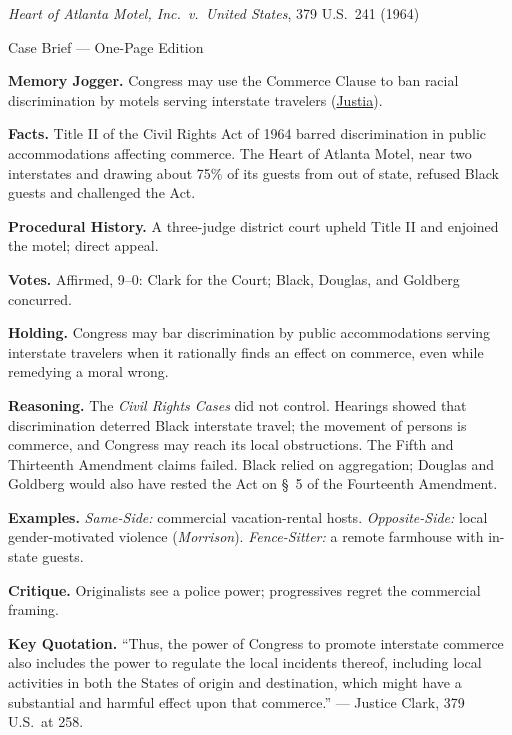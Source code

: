 \documentclass[12pt]{article}
\begin{document}
\begin{center}
{\Large \textit{Heart of Atlanta Motel, Inc.\ v.\ United States}, 379 U.S.\ 241 (1964)\par}
\vspace{0.3em}
{\normalsize Case Brief --- One-Page Edition\par}
\end{center}

\textbf{Memory Jogger.} Congress may use the Commerce Clause to ban racial discrimination by motels serving interstate travelers (\href{https://supreme.justia.com/cases/federal/us/379/241/}{Justia}).

\textbf{Facts.} Title II of the Civil Rights Act of 1964 barred discrimination in public accommodations affecting commerce. The Heart of Atlanta Motel, near two interstates and drawing about 75\% of its guests from out of state, refused Black guests and challenged the Act.

\textbf{Procedural History.} A three-judge district court upheld Title II and enjoined the motel; direct appeal.

\textbf{Votes.} Affirmed, 9--0: Clark for the Court; Black, Douglas, and Goldberg concurred.

\textbf{Holding.} Congress may bar discrimination by public accommodations serving interstate travelers when it rationally finds an effect on commerce, even while remedying a moral wrong.

\textbf{Reasoning.} The \textit{Civil Rights Cases} did not control. Hearings showed that discrimination deterred Black interstate travel; the movement of persons is commerce, and Congress may reach its local obstructions. The Fifth and Thirteenth Amendment claims failed. Black relied on aggregation; Douglas and Goldberg would also have rested the Act on \S~5 of the Fourteenth Amendment.

\textbf{Examples.} \emph{Same-Side:} commercial vacation-rental hosts. \emph{Opposite-Side:} local gender-motivated violence (\textit{Morrison}). \emph{Fence-Sitter:} a remote farmhouse with in-state guests.

\textbf{Critique.} Originalists see a police power; progressives regret the commercial framing.

\textbf{Key Quotation.} ``Thus, the power of Congress to promote interstate commerce also includes the power to regulate the local incidents thereof, including local activities in both the States of origin and destination, which might have a substantial and harmful effect upon that commerce.'' --- Justice Clark, 379 U.S.\ at 258.
\end{document}
